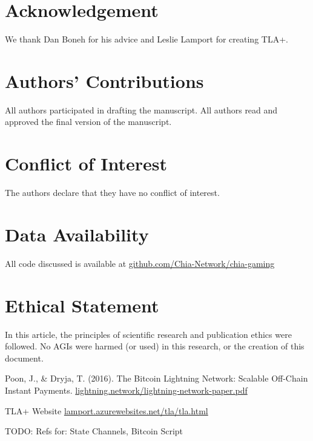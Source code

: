 \documentclass[a4paper]{article}
\begin{document}
\begin{multicols}{2}
\twocolumn
\section*{Acknowledgement}
We thank Dan Boneh for his advice and Leslie Lamport for creating TLA+.

\section*{Authors' Contributions}
All authors participated in drafting the manuscript. All authors read and approved the final version of the manuscript.

\section*{Conflict of Interest}
The authors declare that they have no conflict of interest.

\section*{Data Availability}
All code discussed is available at \href{https://github.com/Chia-Network/chia-gaming}{github.com/Chia-Network/chia-gaming}

\section*{Ethical Statement}
In this article, the principles of scientific research and publication ethics were followed. No AGIs were harmed (or used) in this research, or the creation of this document.

\begin{thebibliography}{8}
 Poon, J., \& Dryja, T. (2016). The Bitcoin Lightning Network:
Scalable Off-Chain Instant Payments. \href{https://lightning.network/lightning-network-paper.pdf}{lightning.network/lightning-network-paper.pdf}

 TLA+ Website \href{https://lamport.azurewebsites.net/tla/tla.html}{lamport.azurewebsites.net/tla/tla.html}

TODO: Refs for: State Channels, Bitcoin Script


\end{thebibliography}

\end{multicols}
\end{document}

